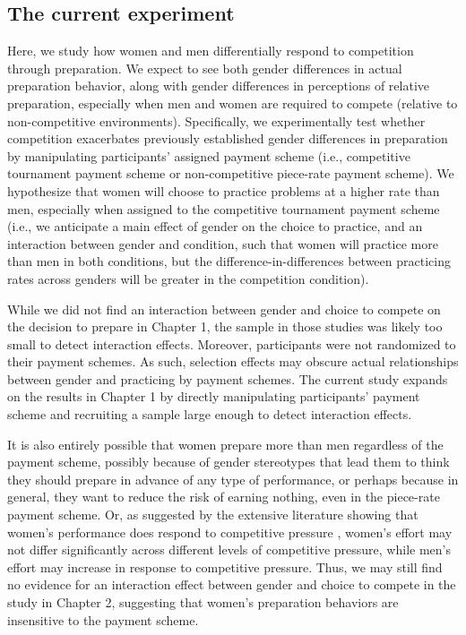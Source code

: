 \documentclass[letterpaper, nobind]{templates/ociamthesis}
\begin{document}
\hypertarget{the-current-experiment}{%
\subsection{The current experiment}\label{the-current-experiment}}

Here, we study how women and men differentially respond to competition through preparation. We expect to see both gender differences in actual preparation behavior, along with gender differences in perceptions of relative preparation, especially when men and women are required to compete (relative to non-competitive environments). Specifically, we experimentally test whether competition exacerbates previously established gender differences in preparation by manipulating participants' assigned payment scheme (i.e., competitive tournament payment scheme or non-competitive piece-rate payment scheme). We hypothesize that women will choose to practice problems at a higher rate than men, especially when assigned to the competitive tournament payment scheme (i.e., we anticipate a main effect of gender on the choice to practice, and an interaction between gender and condition, such that women will practice more than men in both conditions, but the difference-in-differences between practicing rates across genders will be greater in the competition condition).

While we did not find an interaction between gender and choice to compete on the decision to prepare in Chapter 1, the sample in those studies was likely too small to detect interaction effects. Moreover, participants were not randomized to their payment schemes. As such, selection effects may obscure actual relationships between gender and practicing by payment schemes. The current study expands on the results in Chapter 1 by directly manipulating participants' payment scheme and recruiting a sample large enough to detect interaction effects.

It is also entirely possible that women prepare more than men regardless of the payment scheme, possibly because of gender stereotypes that lead them to think they should prepare in advance of any type of performance, or perhaps because in general, they want to reduce the risk of earning nothing, even in the piece-rate payment scheme. Or, as suggested by the extensive literature showing that women's performance does respond to competitive pressure \autocite{Gneezy2003,Gneezy2004,Gunther2010,Samak2013,Booth2022,Gneezy2004,Niederle2011,Cotton2013}, women's effort may not differ significantly across different levels of competitive pressure, while men's effort may increase in response to competitive pressure. Thus, we may still find no evidence for an interaction effect between gender and choice to compete in the study in Chapter 2, suggesting that women's preparation behaviors are insensitive to the payment scheme.
\end{document}

